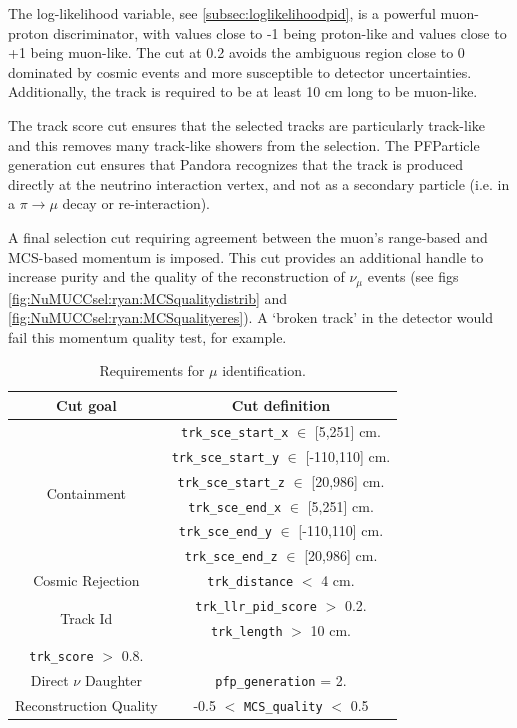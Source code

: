 \par The log-likelihood variable, see \cref{subsec:loglikelihoodpid}, is a powerful muon-proton discriminator, with values close to -1 being proton-like and values close to +1 being muon-like. The cut at 0.2 avoids the ambiguous region close to 0 dominated by cosmic events and more susceptible to detector uncertainties. Additionally, the track is required to be at least 10 cm long to be muon-like.

\par The track score cut ensures that the selected tracks are particularly track-like and this removes many track-like showers from the selection.  The PFParticle generation cut ensures that Pandora recognizes that the track is produced directly at the neutrino interaction vertex, and not as a secondary particle (i.e. in a $\pi \rightarrow \mu$ decay or re-interaction). 

\par A final selection cut requiring agreement between the muon's range-based and MCS-based momentum is imposed. This cut provides an additional handle to increase purity and the quality of the reconstruction of $\nu_{\mu}$ events (see figs \ref{fig:NuMUCCsel:ryan:MCSqualitydistrib} and \ref{fig:NuMUCCsel:ryan:MCSqualityeres}). A `broken track' in the detector would fail this momentum quality test, for example. 

\begin{table}[h!]
\centering
\setlength{\tabcolsep}{10pt}
\renewcommand{\arraystretch}{1.25}
 \begin{tabular}{| c | c |} 
 \hline
 Cut goal & Cut definition \\
 \hline\hline
\multirow{6}{*}{ Containment } &
     \texttt{trk\_sce\_start\_x} $\in$ [5,251] cm. \\&
     \texttt{trk\_sce\_start\_y} $\in$ [-110,110] cm.\\&
     \texttt{trk\_sce\_start\_z} $\in$ [20,986] cm.\\&
     \texttt{trk\_sce\_end\_x} $\in$ [5,251] cm.\\&
     \texttt{trk\_sce\_end\_y} $\in$ [-110,110] cm.\\&
     \texttt{trk\_sce\_end\_z} $\in$ [20,986] cm.\\
   \hline
 \multirow{1}{*}{ Cosmic Rejection } & \texttt{trk\_distance} $<$ 4 cm.\\
 \hline
 \multirow{2}{*}{ Track Id } &
     \texttt{trk\_llr\_pid\_score} $>$ 0.2.\\&
     \texttt{trk\_length} $>$ 10 cm.\\
     \texttt{trk\_score} $>$ 0.8.\\ 
     \hline
 \multirow{1}{*}{ Direct $\nu$ Daughter } &     
                    \texttt{pfp\_generation} = 2.\\
  \hline          
 \multirow{1}{*}{ Reconstruction Quality } & -0.5 $<$ \texttt{MCS\_quality} $<$ 0.5\\
  \hline
\end{tabular}
 \caption{\label{tab:findthemuon} Requirements for $\mu$ identification.}
\end{table}


